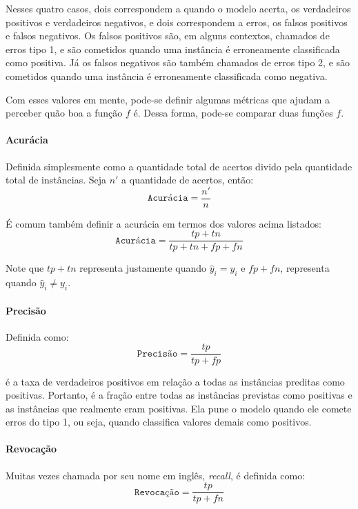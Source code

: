 Nesses quatro casos, dois correspondem a quando o modelo acerta, os verdadeiros
positivos e verdadeiros negativos, e dois correspondem a erros, os falsos
positivos e falsos negativos. Os falsos positivos são, em alguns contextos,
chamados de erros tipo 1, e são cometidos quando uma instância é erroneamente
classificada como positiva. Já os falsos negativos são também chamados de erros
tipo 2, e são cometidos quando uma instância é erroneamente classificada como
negativa.

Com esses valores em mente, pode-se definir algumas métricas que ajudam a
perceber quão boa a função $f$ é. Dessa forma, pode-se comparar duas funções
$f$.

\paragraph{Acurácia}%
\label{par:acuracia}

Definida simplesmente como a quantidade total de acertos divido pela quantidade
total de instâncias. Seja $n'$ a quantidade de acertos, então:
\[
\texttt{Acurácia} = \dfrac{n'}{n}
\]

É comum também definir a acurácia em termos dos valores acima listados:
\[
\texttt{Acurácia} = \dfrac{tp+tn}{tp+tn+fp+fn}
\]

Note que $tp+tn$ representa justamente quando $\hat{y}_i=y_i$ e $fp+fn$,
representa quando $\hat{y}_i\neq y_i$.

\paragraph{Precisão}%
\label{par:precisao}

Definida como:
\[
\texttt{Precisão} = \dfrac{tp}{tp+fp}
\]

é a taxa de verdadeiros positivos em relação a todas as instâncias preditas como
positivas. Portanto, é a fração entre todas as instâncias previstas como
positivas e as instâncias que realmente eram positivas. Ela pune o modelo quando
ele comete erros do tipo 1, ou seja, quando classifica valores demais como
positivos.

\paragraph{Revocação}%
\label{par:revocacao}

Muitas vezes chamada por seu nome em inglês, \textit{recall}, é definida como:
\[
\texttt{Revocação} = \dfrac{tp}{tp+fn}
\]

